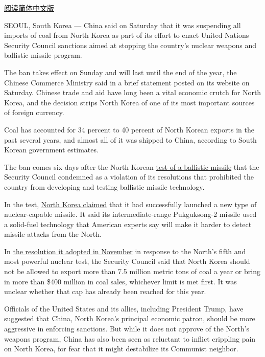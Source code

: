 \href{http://cn.nytimes3xbfgragh.onion/china/20170220/north-korea-china-coal-imports-suspended/}{阅读简体中文版}

SEOUL, South Korea --- China said on Saturday that it was suspending all
imports of coal from North Korea as part of its effort to enact United
Nations Security Council sanctions aimed at stopping the country's
nuclear weapons and ballistic-missile program.

The ban takes effect on Sunday and will last until the end of the year,
the Chinese Commerce Ministry said in a brief statement posted on its
website on Saturday. Chinese trade and aid have long been a vital
economic crutch for North Korea, and the decision strips North Korea of
one of its most important sources of foreign currency.

Coal has accounted for 34 percent to 40 percent of North Korean exports
in the past several years, and almost all of it was shipped to China,
according to South Korean government estimates.

The ban comes six days after the North Korean
\href{https://www.nytimes3xbfgragh.onion/2017/02/11/world/asia/north-korea-missile-test-trump.html}{test
of a ballistic missile} that the Security Council condemned as a
violation of its resolutions that prohibited the country from developing
and testing ballistic missile technology.

In the test,
\href{https://www.nytimes3xbfgragh.onion/2017/02/13/world/asia/north-korea-missile-launch-success.html}{North
Korea claimed} that it had successfully launched a new type of
nuclear-capable missile. It said its intermediate-range Pukguksong-2
missile used a solid-fuel technology that American experts say will make
it harder to detect missile attacks from the North.

In
\href{https://www.nytimes3xbfgragh.onion/2016/11/30/world/asia/north-korea-un-sanctions.html?_r=0}{the
resolution it adopted in November} in response to the North's fifth and
most powerful nuclear test, the Security Council said that North Korea
should not be allowed to export more than 7.5 million metric tons of
coal a year or bring in more than \$400 million in coal sales, whichever
limit is met first. It was unclear whether that cap has already been
reached for this year.

Officials of the United States and its allies, including President
Trump, have suggested that China, North Korea's principal economic
patron, should be more aggressive in enforcing sanctions. But while it
does not approve of the North's weapons program, China has also been
seen as reluctant to inflict crippling pain on North Korea, for fear
that it might destabilize its Communist neighbor.


